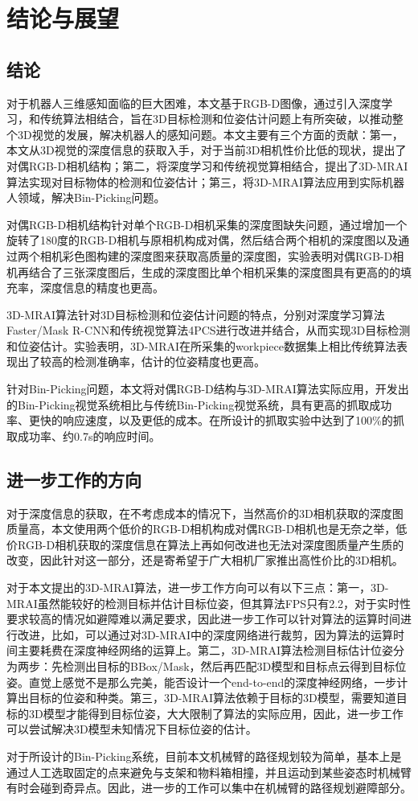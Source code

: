 \chapter{结论与展望}
\label{conclusion}
\section{结论}
对于机器人三维感知面临的巨大困难，本文基于RGB-D图像，通过引入深度学习，和传统算法相结合，旨在3D目标检测和位姿估计问题上有所突破，以推动整个3D视觉的发展，解决机器人的感知问题。本文主要有三个方面的贡献：第一，本文从3D视觉的深度信息的获取入手，对于当前3D相机性价比低的现状，提出了对偶RGB-D相机结构；第二，将深度学习和传统视觉算相结合，提出了3D-MRAI算法实现对目标物体的检测和位姿估计；第三，将3D-MRAI算法应用到实际机器人领域，解决Bin-Picking问题。

对偶RGB-D相机结构针对单个RGB-D相机采集的深度图缺失问题，通过增加一个旋转了180度的RGB-D相机与原相机构成对偶，然后结合两个相机的深度图以及通过两个相机彩色图构建的深度图来获取高质量的深度图，实验表明对偶RGB-D相机再结合了三张深度图后，生成的深度图比单个相机采集的深度图具有更高的的填充率，深度信息的精度也更高。

3D-MRAI算法针对3D目标检测和位姿估计问题的特点，分别对深度学习算法Faster/Mask R-CNN和传统视觉算法4PCS进行改进并结合，从而实现3D目标检测和位姿估计。实验表明，3D-MRAI在所采集的workpiece数据集上相比传统算法表现出了较高的检测准确率，估计的位姿精度也更高。

针对Bin-Picking问题，本文将对偶RGB-D结构与3D-MRAI算法实际应用，开发出的Bin-Picking视觉系统相比与传统Bin-Picking视觉系统，具有更高的抓取成功率、更快的响应速度，以及更低的成本。在所设计的抓取实验中达到了100\%的抓取成功率、约0.7s的响应时间。

\section{进一步工作的方向}
对于深度信息的获取，在不考虑成本的情况下，当然高价的3D相机获取的深度图质量高，本文使用两个低价的RGB-D相机构成对偶RGB-D相机也是无奈之举，低价RGB-D相机获取的深度信息在算法上再如何改进也无法对深度图质量产生质的改变，因此针对这一部分，还是寄希望于广大相机厂家推出高性价比的3D相机。

对于本文提出的3D-MRAI算法，进一步工作方向可以有以下三点：第一，3D-MRAI虽然能较好的检测目标并估计目标位姿，但其算法FPS只有2.2，对于实时性要求较高的情况如避障难以满足要求，因此进一步工作可以针对算法的运算时间进行改进，比如，可以通过对3D-MRAI中的深度网络进行裁剪，因为算法的运算时间主要耗费在深度神经网络的运算上。第二，3D-MRAI算法检测目标估计位姿分为两步：先检测出目标的BBox/Mask，然后再匹配3D模型和目标点云得到目标位姿。直觉上感觉不是那么完美，能否设计一个end-to-end的深度神经网络，一步计算出目标的位姿和种类。第三，3D-MRAI算法依赖于目标的3D模型，需要知道目标的3D模型才能得到目标位姿，大大限制了算法的实际应用，因此，进一步工作可以尝试解决3D模型未知情况下目标位姿的估计。

对于所设计的Bin-Picking系统，目前本文机械臂的路径规划较为简单，基本上是通过人工选取固定的点来避免与支架和物料箱相撞，并且运动到某些姿态时机械臂有时会碰到奇异点。因此，进一步的工作可以集中在机械臂的路径规划避障部分。

